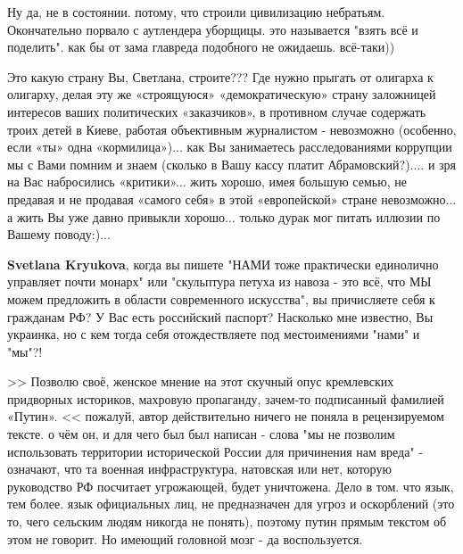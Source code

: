 \begin{itemize}
Ну да, не в состоянии. потому, что строили цивилизацию небратьям. Окончательно
порвало с аутлендера уборщицы. это называется "взять всё и поделить". как бы от
зама главреда подобного не ожидаешь. всё-таки))

 

Это какую страну Вы, Светлана, строите??? Где нужно прыгать от олигарха к
олигарху, делая эту же «строящуюся» «демократическую» страну заложницей
интересов ваших политических «заказчиков», в противном случае содержать троих
детей в Киеве, работая объективным журналистом - невозможно (особенно, если
«ты» одна «кормилица»)\Smiley[1.0][yellow]... как Вы занимаетесь расследованиями коррупции мы с
Вами помним и знаем (сколько в Вашу кассу платит Абрамовский?\Smiley[1.0][yellow]).... и зря на
Вас набросились «критики»\Smiley[1.0][yellow]... жить хорошо, имея большую семью, не предавая и
не продавая «самого себя» в этой «европейской» стране невозможно... а жить Вы
уже давно привыкли хорошо... только дурак мог питать иллюзии по Вашему
поводу:)...


 
\textbf{Svetlana Kryukova}, когда вы пишете "НАМИ тоже практически единолично
управляет почти монарх" или "скульптура петуха из навоза - это всё, что МЫ
можем предложить в области современного искусства", вы причисляете себя к
гражданам РФ? У Вас есть российский паспорт? Насколько мне известно, Вы
украинка, но с кем тогда себя отождествляете под местоимениями "нами" и "мы"?!

 
>> Позволю своё, женское мнение на этот скучный опус кремлевских придворных историков, махровую пропаганду, зачем-то подписанный фамилией «Путин». << пожалуй, автор действительно ничего не поняла в рецензируемом тексте. о чём он, и для чего был был написан - слова "мы не позволим использовать территории исторической России для причинения нам вреда" - означают, что та военная инфраструктура, натовская или нет, которую руководство РФ посчитает угрожающей, будет уничтожена. Дело в том. что язык, тем более. язык официальных лиц, не предназначен для угроз и оскорблений (это то, чего сельским людям никогда не понять), поэтому путин прямым текстом об этом не говорит. Но имеющий головной мозг - да воспользуется.


\end{itemize}
